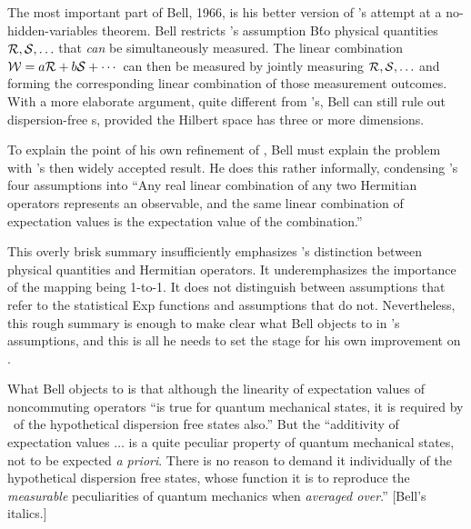 The most important part of Bell, 1966, is his better version of \vN's attempt at a no-hidden-variables theorem.  Bell restricts \vN's assumption B\'  to physical quantities ${\cal R}, {\cal S},\ldots$ that {\it can\/} be simultaneously measured.  The linear combination ${\cal W} = a{\cal R} + b{\cal S}+ \cdots$ can then be measured by jointly measuring ${\cal R}, {\cal S},\ldots$ and forming the corresponding linear combination of those measurement  outcomes.
With a more elaborate argument, quite different from \vN's, Bell can still rule out dispersion-free \se s, provided the Hilbert space has three or more dimensions.   

To explain the point of his own refinement of \vN, Bell must explain the problem with \vN's then widely accepted result.  He does this rather informally, condensing  \vN's four assumptions into ``Any real linear combination of any two Hermitian operators represents an observable, and the same linear combination of expectation values is the expectation value of the combination.''  

This overly brisk summary    insufficiently emphasizes \vN's distinction between physical quantities and Hermitian operators.   
It underemphasizes the importance of the mapping being 1-to-1.    It does not distinguish between assumptions that refer to the statistical Exp functions and assumptions that do not.    Nevertheless, this  rough summary is  enough to make clear what Bell objects to in \vN's assumptions, and this is all he needs to set the stage for his own improvement on \vN.

What Bell objects to is that although the linearity of expectation values of noncommuting operators ``is true for quantum mechanical states, it is required by \vN\ of the hypothetical dispersion free states also.''  But the ``additivity of expectation values $\ldots$ is a quite peculiar property of quantum mechanical states, not to be expected {\it a priori\/}.  There is no reason to demand it individually of the hypothetical dispersion free states, whose function it is to reproduce the {\it measurable\/} peculiarities of quantum mechanics when {\it averaged over\/}.'' [Bell's italics.]

